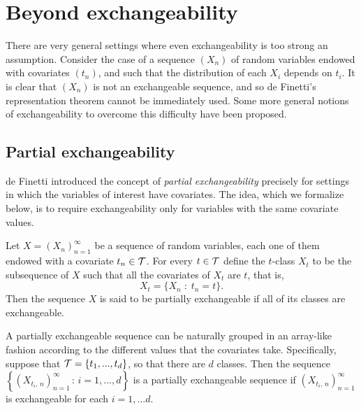 

\section{Beyond exchangeability} \label{section:exchangeability}




There are very general settings where even exchangeability is too strong an assumption. Consider the case of a sequence $(X_n)$ of random variables endowed with covariates $(t_n)$, and such that the distribution of each $X_i$ depends on $t_i$. It is clear that $(X_n)$ is not an exchangeable sequence, and so de Finetti's representation theorem cannot be immediately used. Some more general notions of exchangeability to overcome this difficulty have been proposed.



\subsection{Partial exchangeability}


de Finetti \cite{deFinetti:1938:partial_exch} introduced the concept of \textit{partial exchangeability} precisely for settings in which the variables of interest have covariates. The idea, which we formalize below, is to require exchangeability only for variables with the same covariate values.

\begin{definition} \label{def:partial_exchangeability}
	Let $X = (X_n)_{n=1}^{\infty}$ be a sequence of random variables, each one of them endowed with a covariate $t_n \in \mathcal{T}$. For every $t \in \mathcal{T}$ define the $t$-class $X_t$ to be the subsequence of $X$ such that all the covariates of $X_t$ are $t$, that is,
	\begin{equation*}
		X_t = \{ X_n \; : \; t_n = t \}.
	\end{equation*}
	Then the sequence $X$ is said to be partially exchangeable if all of its classes are exchangeable.
\end{definition}

A partially exchangeable sequence can be naturally grouped in an array-like fashion according to the different values that the covariates take. Specifically, suppose that $\mathcal{T} = \{t_1, ..., t_d \}$, so that there are $d$ classes. Then the sequence $\left\{ (X_{t_i, \, n})_{n=1}^{\infty} \, : \, i=1, ..., d \right\}$ is a partially exchangeable sequence if $(X_{t_i, \, n})_{n=1}^{\infty}$ is exchangeable for each $i=1, ...d$. \\

